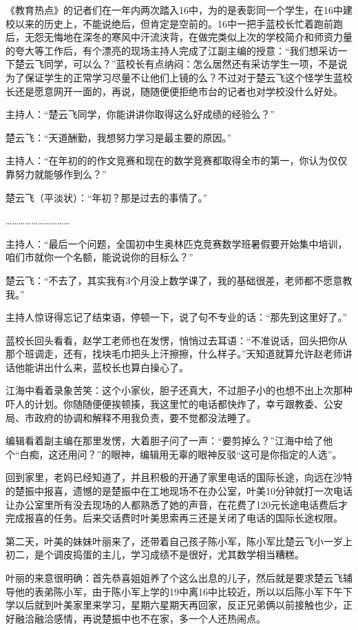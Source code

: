 《教育热点》的记者们在一年内两次踏入16中，为的是表彰同一个学生，在16中建校以来的历史上，不能说绝后，但肯定是空前的。16中一把手蓝校长忙着跑前跑后，无怨无悔地在深冬的寒风中汗流浃背，在做完类似上次的学校简介和师资力量的夸大等工作后，有个漂亮的现场主持人完成了江副主编的授意：“我们想采访一下楚云飞同学，可以么？”蓝校长有点纳闷：怎么居然还有采访学生一项，不是说为了保证学生的正常学习尽量不让他们上镜的么？不过对于楚云飞这个怪学生蓝校长还是愿意网开一面的，再说，随随便便拒绝市台的记者也对学校没什么好处。

主持人：“楚云飞同学，你能讲讲你取得这么好成绩的经验么？”

楚云飞：“天道酬勤，我想努力学习是最主要的原因。”

主持人：“在年初的的作文竞赛和现在的数学竞赛都取得全市的第一，你认为仅仅靠努力就能够作到么？”

楚云飞（平淡状）：“年初？那是过去的事情了。”

…………………………

主持人：“最后一个问题，全国初中生奥林匹克竞赛数学班暑假要开始集中培训，咱们市就你一个名额，能说说你的目标么？”

楚云飞：“不去了，其实我有3个月没上数学课了，我的基础很差，老师都不愿意教我。”

主持人惊讶得忘记了结束语，停顿一下，说了句不专业的话：“那先到这里好了。”

蓝校长回头看看，赵学工老师也在发愣，悄悄过去耳语：“不准说话，回头把你从那个班调走，还有，找块毛巾把头上汗擦擦，什么样子。”天知道就算允许赵老师讲话他能讲出什么来，蓝校长也算白操心了。

江海中看着录象苦笑：这个小家伙，胆子还真大，不过胆子小的也想不出上次那种吓人的计划。你随随便便挨顿揍，我这里忙的电话都快炸了，幸亏跟教委、公安局、市政府的协调和解释不用我负责，要不觉都没法睡了。

编辑看着副主编在那里发愣，大着胆子问了一声：“要剪掉么？”江海中给了他个“白痴，这还用问？”的眼神，编辑用无辜的眼神反驳“这可是你指定的人选”。

回到家里，老妈已经知道了，并且积极的开通了家里电话的国际长途，向远在沙特的楚振中报喜，遗憾的是楚振中在工地现场不在办公室，叶美10分钟就打一次电话让办公室里所有没去现场的人都熟悉了她的声音，在花费了120元长途电话费后才完成报喜的任务。后来交话费时叶美思索再三还是关闭了电话的国际长途权限。

第二天，叶美的妹妹叶丽来了，还带着自己孩子陈小军，陈小军比楚云飞小一岁上初二，是个调皮捣蛋的主儿，学习成绩不是很好，尤其数学相当糟糕。

叶丽的来意很明确：首先恭喜姐姐养了个这么出息的儿子，然后就是要求楚云飞辅导他的表弟陈小军，由于陈小军上学的19中离16中比较近，所以以后陈小军下午下学以后就到叶美家里来学习，星期六星期天再回家，反正兄弟俩以前接触也少，正好融洽融洽感情，再说楚振中也不在家，多一个人还热闹点。

